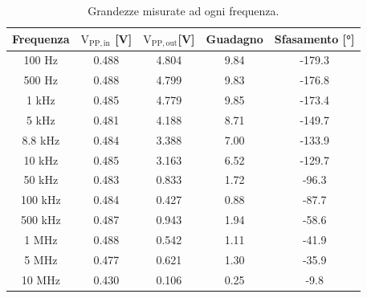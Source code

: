 \documentclass{report}
\begin{document}
\begin{table}[h!]
	\centering
	\begin{tabular}{|c|c|c|c|c|}
		\hline
		\textbf{Frequenza} &\boldmath$\displaystyle\mathrm{{V_{PP,in}}}$ \textbf{[V]} & \boldmath$\displaystyle\mathrm{{V_{PP,out}}}$\textbf{[V]} & \textbf{Guadagno} & \textbf{Sfasamento [°]}\\
		\hline
		100 Hz & 0.488 & 4.804 & 9.84 & -179.3\\
		\hline
		500 Hz & 0.488 & 4.799 & 9.83 & -176.8\\
		\hline
		1 kHz & 0.485 & 4.779 & 9.85 & -173.4\\
		\hline
		5 kHz & 0.481 & 4.188 & 8.71 & -149.7\\
		\hline
		8.8 kHz & 0.484 & 3.388 & 7.00 & -133.9\\
		\hline
		10 kHz & 0.485 & 3.163 & 6.52 & -129.7\\
		\hline
		50 kHz & 0.483 & 0.833 & 1.72 & -96.3\\
		\hline
		100 kHz & 0.484 & 0.427 & 0.88 & -87.7\\
		\hline
		500 kHz & 0.487 & 0.943 & 1.94 & -58.6\\
		\hline
		1 MHz & 0.488 & 0.542 & 1.11 & -41.9\\
		\hline
		5 MHz & 0.477 & 0.621 & 1.30 & -35.9\\
		\hline
		10 MHz & 0.430 & 0.106 & 0.25 & -9.8\\
		\hline\end{tabular}
\caption{Grandezze misurate ad ogni frequenza.}
\label{table:misure}
\end{table}


\end{document}
